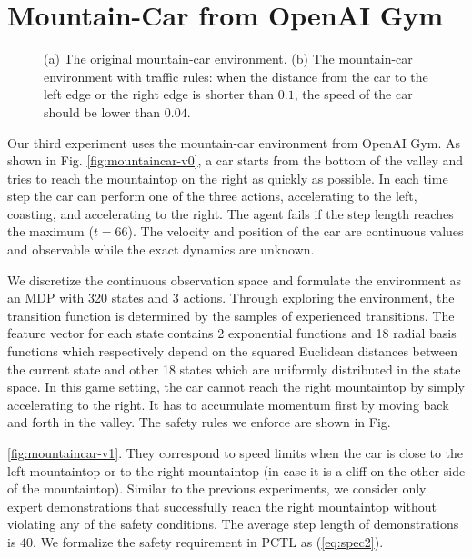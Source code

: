 {\section{Mountain-Car from OpenAI Gym}
\begin{figure}[h]
\centering
{}
\caption[The mountaincar environment]{(a) The original mountain-car environment. (b) The mountain-car environment with traffic rules: when the distance from the car to the left edge or the right edge is shorter than $0.1$, the speed of the car should be lower than $0.04$.}  
\label{fig:mountaincar}
\end{figure}

Our third experiment uses the mountain-car environment from OpenAI Gym. As shown in Fig. {\ref{fig:mountaincar-v0}}, a car starts from the bottom of the valley and tries to reach the mountaintop on the right as quickly as possible. In each time step the car can perform one of the three actions, accelerating to the left, coasting, and accelerating to the right. The agent fails if the step length reaches the maximum ($t=66$). The velocity and position of the car are continuous values and observable while the exact dynamics are unknown.

We discretize the continuous observation space and formulate the environment as an MDP with 320 states and 3 actions. Through exploring the environment, the transition function is determined by the samples of experienced transitions. The feature vector for each state contains 2 exponential functions and 18 radial basis functions which respectively depend on the squared Euclidean distances between the current state and other 18 states which are uniformly distributed in the state space. In this game setting, the car cannot reach the right mountaintop by simply accelerating to the right. It has to accumulate momentum first by moving back and forth in the valley. The safety rules we enforce are shown in Fig.~{\ref{fig:mountaincar-v1}. They correspond to speed limits when the car is close to the left mountaintop or to the right mountaintop (in case it is a cliff on the other side of the mountaintop). Similar to the previous experiments, we consider only expert demonstrations that successfully reach the right mountaintop without violating any of the safety conditions. 
The average step length of demonstrations is $40$. 
 We formalize the safety requirement in PCTL as (\ref{eq:spec2}). 

}}
